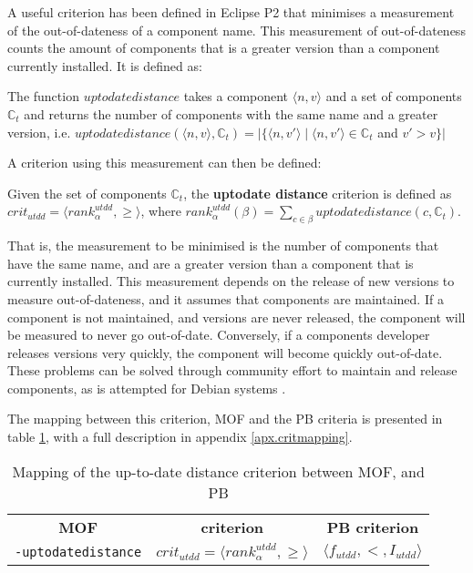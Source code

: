 A useful criterion has been defined in Eclipse P2 that minimises a measurement of the out-of-dateness of a component name.
This measurement of out-of-dateness counts the amount of components that is a greater version than a component currently installed.
It is defined as:
\begin{defs}
The function $uptodatedistance$ takes a component $\langle n, v \rangle$ and a set of components $\mathbb{C}_t$ and returns the number of components with the same name and a greater version,
i.e. $uptodatedistance(\langle n, v \rangle,\mathbb{C}_t) = |\{\langle n, v' \rangle \mid \langle n, v' \rangle \in \mathbb{C}_t $ and $ v' > v \}|$
\end{defs}

A criterion using this measurement can then be defined:
\begin{defs}
	Given the set of components $\mathbb{C}_t$, the \textbf{uptodate distance} criterion is defined as $crit_{utdd} = \langle rank^{utdd}_{\alpha}, \geq \rangle$,
	where $rank^{utdd}_{\alpha}(\beta) = \sum_{c \in \beta} uptodatedistance(c,\mathbb{C}_t)$.
\end{defs}
That is, the measurement to be minimised is the number of components that have the same name, and are a greater version than a component that is currently installed.
This measurement depends on the release of new versions to measure out-of-dateness, and it assumes that components are maintained.
If a component is not maintained, and versions are never released, the component will be measured to never go out-of-date.
Conversely, if a components developer releases versions very quickly, the component will become quickly out-of-date.
These problems can be solved through community effort to maintain and release components, as is attempted for Debian systems \citep{Barth2005}.

The mapping between this criterion, MOF and the PB criteria is presented in table \ref{impl.ucritmapping}, with a full description in appendix \ref{apx.critmapping}.
\begin{table}[h!]
\centering
\begin{tabular}{c | c | c}
\textbf{MOF} 		& \textbf{\modelname criterion} & \textbf{PB criterion} \\
\texttt{-uptodatedistance} 	& $crit_{utdd} = \langle rank^{utdd}_{\alpha}, \geq \rangle$ & $\langle f_{utdd}, <, I_{utdd} \rangle$ \\
\end{tabular}
\caption{Mapping of the up-to-date distance criterion between MOF, \modelname and PB}
\label{impl.ucritmapping}
\end{table}

